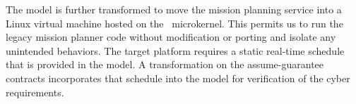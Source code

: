 The model is further transformed to move the mission planning service into a 
Linux virtual machine hosted on the \selFour \ microkernel. This permits us to run the
legacy mission planner code without modification or porting and isolate any 
unintended behaviors.  
The target platform requires a static real-time schedule that is provided in the model.
A transformation on the assume-guarantee contracts incorporates that schedule into the model
for verification of the cyber requirements.

%
